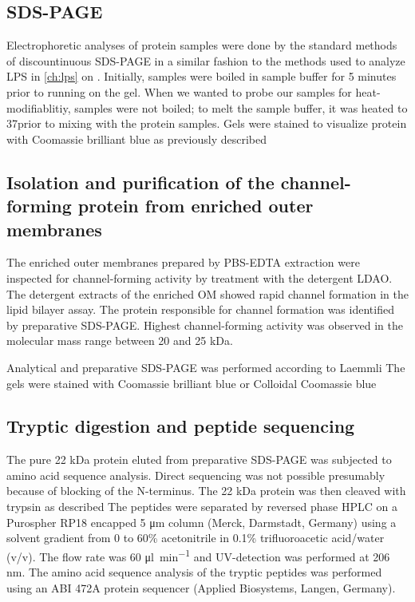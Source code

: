 \subsection{\Acl{SDS-PAGE}} \label{sec:porin-sds-page}
Electrophoretic analyses of protein samples were done by the standard methods of discountinuous \ac{SDS-PAGE} in a similar fashion to the methods used to analyze \ac{LPS} in \cref{ch:lps} on . Initially, samples were boiled in sample buffer for 5 minutes prior to running on the gel. When we wanted to probe our samples for heat-modifiablitiy, samples were not boiled; to melt the sample buffer, it was heated to 37\cel prior to mixing with the protein samples. Gels were stained to visualize protein with Coomassie brilliant blue as previously described

\subsection{Isolation and purification of the channel-forming protein from enriched outer membranes}
\label{sub:porin_isolation}
The enriched outer membranes prepared by \ac{PBS}-\ac{EDTA} extraction were inspected for channel-forming activity by treatment with the detergent \ac{LDAO}. The detergent extracts of the enriched OM showed rapid channel formation in the lipid bilayer assay. The protein responsible for channel formation was identified by preparative \ac{SDS-PAGE}. Highest channel-forming activity was observed in the molecular mass range between 20 and 25 kDa.

Analytical and preparative \ac{SDS-PAGE} was performed according to Laemmli The gels were stained with Coomassie brilliant blue or Colloidal Coomassie blue 

\subsection{Tryptic digestion and peptide sequencing}
\label{sub:porin_tryptic}
The pure 22 kDa protein eluted from preparative \ac{SDS-PAGE} was subjected to amino acid sequence analysis. Direct sequencing was not possible presumably because of blocking of the N-terminus. The 22 kDa protein was then cleaved with trypsin as described The peptides were separated by reversed phase HPLC on a Purospher RP18 encapped 5 \si{\micro\metre} column (Merck, Darmstadt, Germany) using a solvent gradient from 0 to 60\% acetonitrile in 0.1\% trifluoroacetic acid/water (v/v). The flow rate was 60 \si{\micro\litre\per\minute} and UV-detection was performed at 206 \si{\nano\metre}. The amino acid sequence analysis of the tryptic peptides was performed using an ABI 472A protein sequencer (Applied Biosystems, Langen, Germany).

